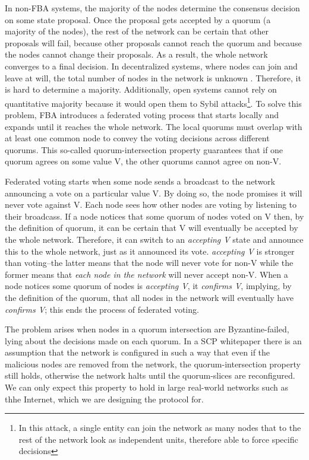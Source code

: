 In non-FBA systems, the majority of the nodes determine the consensus decision on some state proposal. Once the proposal gets accepted by a quorum (a majority of the nodes), the rest of the network can be certain that other proposals will fail, because other proposals cannot reach the quorum and because the nodes cannot change their proposals. As a result, the whole network converges to a final decision.
In decentralized systems, where nodes can join and leave at will, the total number of nodes in the network is unknown . Therefore, it is hard to determine a majority. Additionally, open systems cannot rely on quantitative majority because it would open them to Sybil attacks\footnote{In this attack, a single entity can join the network as many nodes that to the rest of the network look as independent units, therefore able to force specific decisions}. To solve this problem, FBA introduces a federated voting process that starts locally and expands until it reaches the whole network. The local quorums must overlap with at least one common node to convey the voting decisions across different quorums. This so-called quorum-intersection property guarantees that if one quorum agrees on some value V, the other quorums cannot agree on non-V.

Federated voting starts when some node sends a broadcast to the network announcing a vote on a particular value V. By doing so, the node promises it will never vote against V. Each node sees how other nodes are voting by listening to their broadcass. If a node notices that some quorum of nodes voted on V then, by the definition of quorum, it can be certain that V will eventually be accepted by the whole network. Therefore, it can switch to an \textit{accepting V} state and announce this to the whole network, just as it announced its vote. \textit{accepting V} is stronger than voting--the latter means that the node will never vote for non-V while the former means that \textit{each node in the network} will never accept non-V. When a node notices some quorum of nodes is \textit{accepting V}, it \textit{confirms V}, implying, by the definition of the quorum, that all nodes in the network will eventually have \textit{confirms V}; this ends the process of federated voting.

The problem arises when nodes in a quorum intersection are Byzantine-failed, lying about the decisions made on each quorum. In a SCP whitepaper there is an assumption that the network is configured in such a way that even if the malicious nodes are removed from the network, the quorum-intersection property still holds, otherwise the network halts until the quorum-slices are reconfigured.
We can only expect this property to hold in large real-world networks such as thhe Internet, which we are designing the protocol for.


